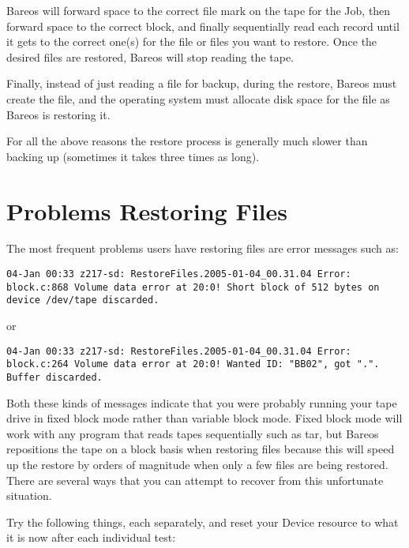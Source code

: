 Bareos will forward space to the correct file mark on the tape for the Job,
then forward space to the correct block, and finally sequentially read each
record until it gets to the correct one(s) for the file or files you want to
restore. Once the desired files are restored, Bareos will stop reading the
tape.

Finally, instead of just reading a file for backup, during the restore, Bareos
must create the file, and the operating system must allocate disk space for
the file as Bareos is restoring it.

For all the above reasons the restore process is generally much slower than
backing up (sometimes it takes three times as long).

\section{Problems Restoring Files}


The most frequent problems users have restoring files are error messages such
as:

\footnotesize
\begin{verbatim}
04-Jan 00:33 z217-sd: RestoreFiles.2005-01-04_00.31.04 Error:
block.c:868 Volume data error at 20:0! Short block of 512 bytes on
device /dev/tape discarded.
\end{verbatim}
\normalsize

or

\footnotesize
\begin{verbatim}
04-Jan 00:33 z217-sd: RestoreFiles.2005-01-04_00.31.04 Error:
block.c:264 Volume data error at 20:0! Wanted ID: "BB02", got ".".
Buffer discarded.
\end{verbatim}
\normalsize

Both these kinds of messages indicate that you were probably running your tape
drive in fixed block mode rather than variable block mode. Fixed block mode
will work with any program that reads tapes sequentially such as tar, but
Bareos repositions the tape on a block basis when restoring files because this
will speed up the restore by orders of magnitude when only a few files are being
restored. There are several ways that you can attempt to recover from this
unfortunate situation.

Try the following things, each separately, and reset your Device resource to
what it is now after each individual test:

